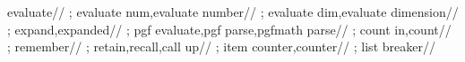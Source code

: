 {  evaluate/\@nil/
  ;
  evaluate num,evaluate number/\@nil/
  ;
  evaluate dim,evaluate dimension/\@nil/
  ;
  expand,expanded/\@nil/
  ;
  pgf evaluate,pgf parse,pgfmath parse/\@nil/
  ;
  count in,count/\@nil/
  ;
  remember/\@nil/
  ;
  retain,recall,call up/\@nil/
  ;
  item counter,counter/\foreachdefaultitemcounter/
  ;
  list breaker/\foreachlistbreaker/
}
